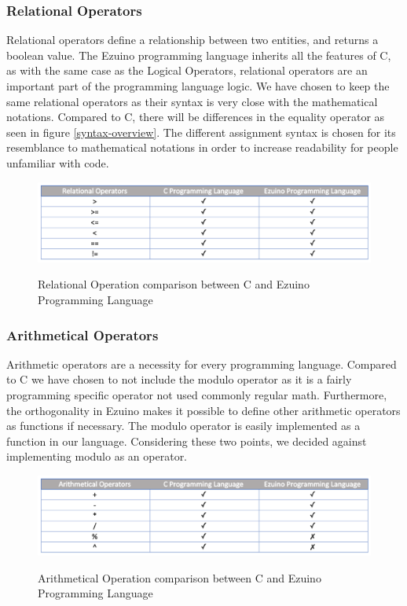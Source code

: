 \subsubsection*{Relational Operators}
Relational operators define a relationship between two entities, and returns a boolean value.
The Ezuino programming language inherits all the features of C, as with the same case as the Logical Operators, relational operators are an important part of the programming language logic. We have chosen to keep the same relational operators as their syntax is very close with the mathematical notations. Compared to C, there will be differences in the equality operator as seen in figure \ref{syntax-overview}. The different assignment syntax is chosen for its resemblance to mathematical notations in order to increase readability for people unfamiliar with code.
\begin{figure}[H]
\centering
\caption{Relational Operation comparison between C and Ezuino Programming Language}
\includegraphics[scale=0.60]{figures/language_features/langf04.png}
\label{lf04}
\end{figure}

\subsubsection*{Arithmetical Operators}
Arithmetic operators are a necessity for every programming language.
Compared to C we have chosen to not include the modulo operator as it is a fairly programming specific operator not used commonly regular math. Furthermore, the orthogonality in Ezuino makes it possible to define other arithmetic operators as functions if necessary. The modulo operator is easily implemented as a function in our language. Considering these two points, we decided against implementing modulo as an operator.
\begin{figure}[H]
\centering
\caption{Arithmetical Operation comparison between C and Ezuino Programming Language}
\includegraphics[scale=0.60]{figures/language_features/langf05.png}
\label{lf05}
\end{figure}

